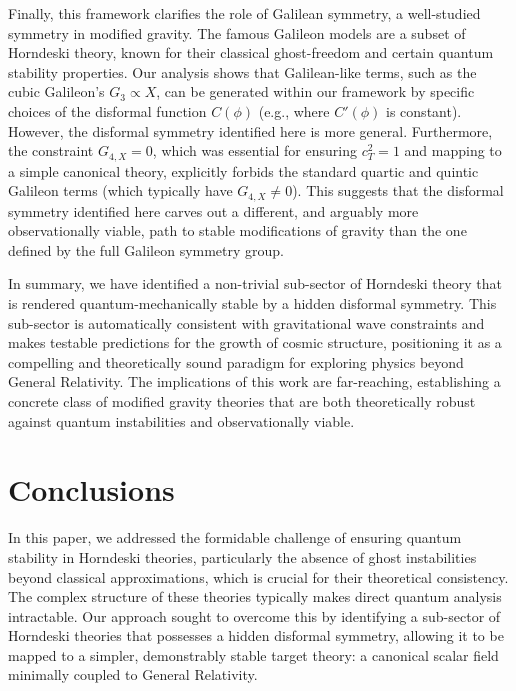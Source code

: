 \documentclass[twocolumn]{aastex631}
\begin{document}
Finally, this framework clarifies the role of Galilean symmetry, a well-studied symmetry in modified gravity. The famous Galileon models are a subset of Horndeski theory, known for their classical ghost-freedom and certain quantum stability properties. Our analysis shows that Galilean-like terms, such as the cubic Galileon's $G_3 \propto X$, can be generated within our framework by specific choices of the disformal function $C(\phi)$ (e.g., where $C'(\phi)$ is constant). However, the disformal symmetry identified here is more general. Furthermore, the constraint $G_{4,X}=0$, which was essential for ensuring $c_T^2=1$ and mapping to a simple canonical theory, explicitly forbids the standard quartic and quintic Galileon terms (which typically have $G_{4,X} \neq 0$). This suggests that the disformal symmetry identified here carves out a different, and arguably more observationally viable, path to stable modifications of gravity than the one defined by the full Galileon symmetry group.

In summary, we have identified a non-trivial sub-sector of Horndeski theory that is rendered quantum-mechanically stable by a hidden disformal symmetry. This sub-sector is automatically consistent with gravitational wave constraints and makes testable predictions for the growth of cosmic structure, positioning it as a compelling and theoretically sound paradigm for exploring physics beyond General Relativity. The implications of this work are far-reaching, establishing a concrete class of modified gravity theories that are both theoretically robust against quantum instabilities and observationally viable.

\section{Conclusions}
\label{sec:conclusions}
In this paper, we addressed the formidable challenge of ensuring quantum stability in Horndeski theories, particularly the absence of ghost instabilities beyond classical approximations, which is crucial for their theoretical consistency. The complex structure of these theories typically makes direct quantum analysis intractable. Our approach sought to overcome this by identifying a sub-sector of Horndeski theories that possesses a hidden disformal symmetry, allowing it to be mapped to a simpler, demonstrably stable target theory: a canonical scalar field minimally coupled to General Relativity.
\end{document}
